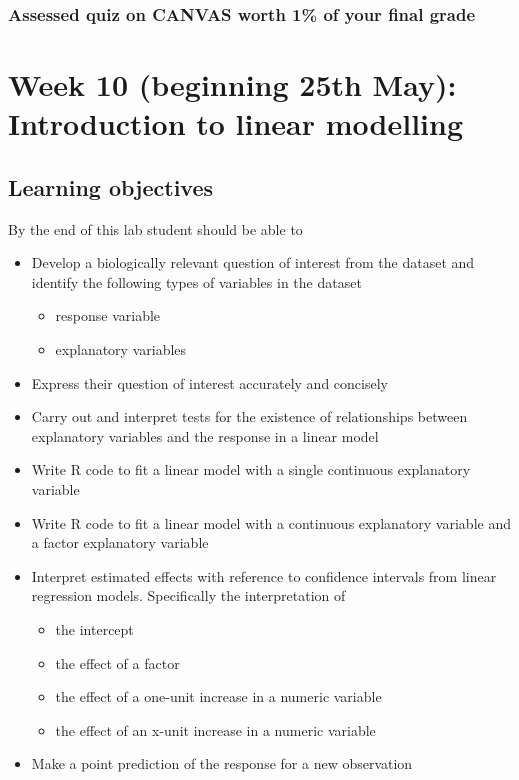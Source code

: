 \documentclass{article}
\begin{document}
\subsubsection*{Assessed quiz on CANVAS worth 1\% of your final grade}




\newpage

\section*{Week 10 (beginning 25th May): Introduction to linear modelling}
\subsection*{Learning objectives}
By the end of this lab student should be able to
\begin{itemize}
\item Develop a biologically relevant question of interest  from the dataset and identify the following types of variables in the dataset
  \begin{itemize}
  \item response variable
  \item explanatory variables
  \end{itemize}
\item Express their question of interest accurately and concisely
\item Carry out and interpret tests for the existence of relationships between explanatory variables and the response in a linear model
\item Write R code to fit a linear model with a single continuous explanatory variable
\item Write R code to fit a linear model with a continuous explanatory variable and a factor explanatory variable
\item Interpret estimated effects with reference to confidence intervals from linear regression models. Specifically the interpretation of
  \begin{itemize}
  \item the intercept
  \item the effect of a factor
  \item the effect of a one-unit increase in a numeric variable
  \item the effect of an x-unit increase in a numeric variable
  \end{itemize}
\item Make a point prediction of the response for a new observation
\end{itemize}
\end{document}
